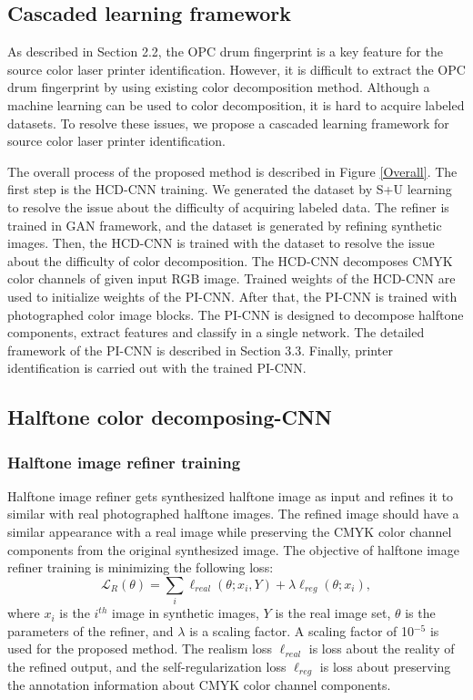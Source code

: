 \documentclass[5p, times]{elsarticle}
\begin{document}
\subsection{Cascaded learning framework}
As described in Section 2.2, the OPC drum fingerprint is a key feature for the source color laser printer identification. However, it is difficult to extract the OPC drum fingerprint by using existing color decomposition method. Although a machine learning can be used to color decomposition, it is hard to acquire labeled datasets. To resolve these issues, we propose a cascaded learning framework for source color laser printer identification.

The overall process of the proposed method is described in Figure \ref{Overall}. The first step is the HCD-CNN training. We generated the dataset by S+U learning to resolve the issue about the difficulty of acquiring labeled data. The refiner is trained in GAN framework, and the dataset is generated by refining synthetic images. Then, the HCD-CNN is trained with the dataset to resolve the issue about the difficulty of color decomposition. The HCD-CNN decomposes CMYK color channels of given input RGB image. Trained weights of the HCD-CNN are used to initialize weights of the PI-CNN. After that, the PI-CNN is trained with photographed color image blocks. The PI-CNN is designed to decompose halftone components, extract features and classify in a single network. The detailed framework of the PI-CNN is described in Section 3.3. Finally, printer identification is carried out with the trained PI-CNN.

\subsection{Halftone color decomposing-CNN}
\subsubsection{Halftone image refiner training}

Halftone image refiner gets synthesized halftone image as input and refines it to similar with real photographed halftone images. The refined image should have a similar appearance with a real image while preserving the CMYK color channel components from the original synthesized image. The objective of halftone image refiner training is minimizing the following loss:
\begin{equation}
\mathcal{L}_R(\theta)=\sum_{i}\ell_{real}(\theta;x_i,Y)+\lambda\ell_{reg}(\theta;x_i),
\end{equation}
where $x_i$ is the $i^{th}$ image in synthetic images, $Y$ is the real image set, $\theta$ is the parameters of the refiner, and $\lambda$ is a scaling factor. A scaling factor of 10$^{-5}$ is used for the proposed method. The realism loss $\ell_{real}$ is loss about the reality of the refined output, and the self-regularization loss $\ell_{reg}$ is loss about preserving the annotation information about CMYK color channel components.
\end{document}

